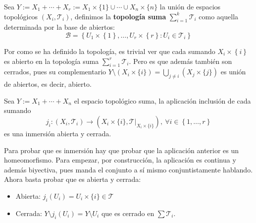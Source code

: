 \begin{defi}
Sea $Y := X_1 + \cdots + X_r := X_1 \times \{1\} \cup \cdots \cup X_n\times\{n\}$ la unión de espacios topológicos $(X_i, \mathcal{T}_i)$, definimos la \textbf{topología suma} $\sum_{i=1}^{k} \mathcal{T}_i$ como aquella determinada por la base de abiertos:
\[
\mathcal{B} = \left\{ U_1 \times \left\{ 1 \right\}, \ldots, U_r \times \left\{ r \right\}: U_i \in \mathcal{T}_i \right\}
\]
\end{defi}

\begin{obs}
Por como se ha definido la topología, es trivial ver que cada sumando $X_i \times \left\{ i \right\}$  es abierto en la topología suma $\sum_{i=1}^{r} \mathcal{T}_i$. Pero es que además también son cerrados, pues su complementario $Y \setminus (X_i \times \{i\}) = \bigcup_{j \neq i} (X_j \times\{j\})$ es unión de abiertos, es decir, abierto.
\end{obs}

\begin{prop}
Sea $Y := X_1 + \cdots + X_n$ el espacio topológico suma, la aplicación inclusión de cada sumando
\[
j_i: \left( X_i, \mathcal{T}_i \right) \rightarrow \left( X_i\times \{i\}, \mathcal{T}|_{X_i \times \{i\}} \right),\ \forall i \in \left\{ 1, \ldots, r \right\}
\]
es una inmersión abierta y cerrada.
\end{prop}
\begin{demo}
Para probar que es inmersión hay que probar que la aplicación anterior es un homeomorfismo. Para empezar, por construcción, la aplicación es continua y además biyectiva, pues manda el conjunto a sí mismo conjuntistamente hablando. Ahora basta probar que es abierta y cerrada:
\begin{itemize}
    \item Abierta: $j_i\left( U_i \right) = U_i \times \{i\} \in \mathcal{T}$
    \item Cerrada: $Y\setminus j_i\left( U_i \right) = Y \setminus U_i$ que es cerrado en $\sum \mathcal{T}_i$.
\end{itemize}
\end{demo}

